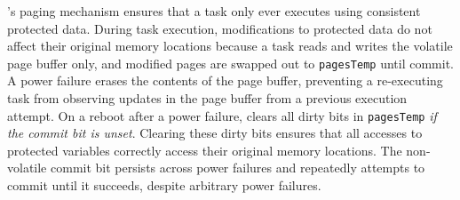 \sys's paging mechanism ensures that a task only ever executes using consistent
protected data.  During task execution, modifications to protected data do not
affect their original memory locations because a task reads and writes the
volatile page buffer only, and modified pages are swapped out to
\texttt{pagesTemp} until commit.  A power failure erases the contents of the
page buffer, preventing a re-executing task from observing updates in the page
buffer from a previous execution attempt.  On a reboot after a power failure,
\sys clears all dirty bits in {\tt pagesTemp} {\em if the commit bit is unset}.
Clearing these dirty bits ensures that all accesses to protected variables
correctly access their original memory locations. The non-volatile commit bit
persists across power failures and \sys repeatedly attempts to commit until it
succeeds, despite arbitrary power failures.


%
%
%

